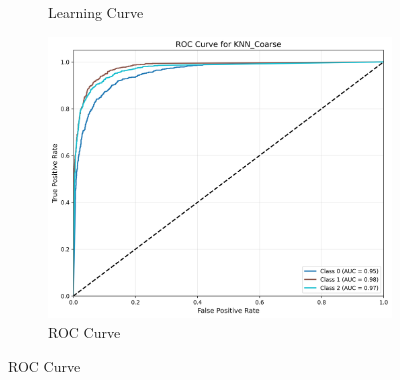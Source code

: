 \documentclass[10pt]{article}
\begin{document}
\begin{figure}[!ht]
\begin{subfigure}{0.33\textwidth}
            \caption{Learning Curve}
        \end{subfigure}
        \begin{subfigure}{0.33\textwidth}
            \centering
            \includegraphics[width=\textwidth]{code/ResultsMainAugZip/plots/Block1_Tree_Based_Experiment_I/roc_curve_KNN_Coarse.png}
            \caption{ROC Curve}
        \end{subfigure}
    \end{figure}
    
\end{document}
